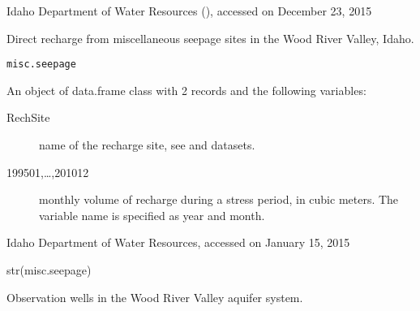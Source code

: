 \documentclass[a4paper]{book}
\begin{document}
%
\begin{Source}\relax
Idaho Department of Water Resources
(),
accessed on December 23, 2015
\end{Source}
%
\begin{Examples}
\end{Examples}
%
\begin{Description}\relax
Direct recharge from miscellaneous seepage sites in the Wood River Valley, Idaho.
\end{Description}
%
\begin{Usage}
\begin{verbatim}
misc.seepage
\end{verbatim}
\end{Usage}
%
\begin{Format}
An object of data.frame class with 2 records and the following variables:
\begin{description}

\item[RechSite] name of the recharge site, see  and
 datasets.
\item[199501,\dots,201012] monthly volume of recharge during a stress period, in cubic meters.
The variable name is specified as year and month.

\end{description}
\end{Format}
%
\begin{Source}\relax
Idaho Department of Water Resources, accessed on January 15, 2015
\end{Source}
%
\begin{Examples}
\begin{ExampleCode}
str(misc.seepage)

\end{ExampleCode}
\end{Examples}
%
\begin{Description}\relax
Observation wells in the Wood River Valley aquifer system.
\end{Description}
\end{document}
